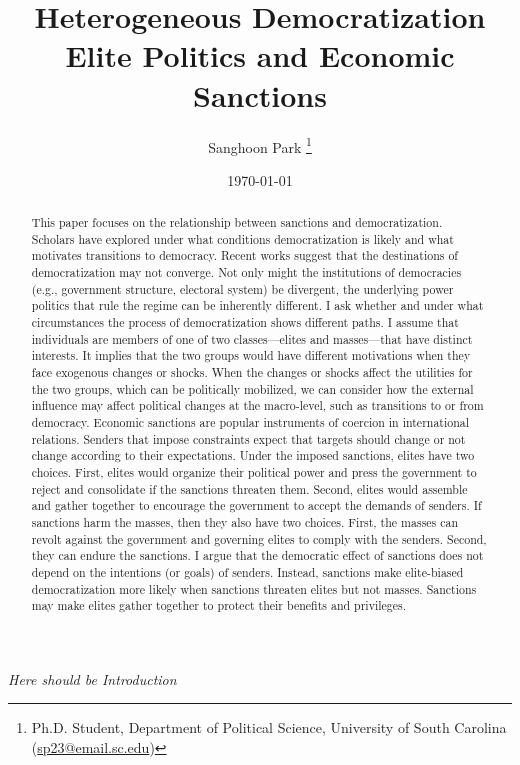 \documentclass[11pt, letterpage, titlepage]{article}
\title{\bf Heterogeneous Democratization\\
\Large Elite Politics and Economic Sanctions}
\author{Sanghoon Park
	\thanks{\small Ph.D. Student, Department of Political Science, University of South Carolina\\
		\hspace*{1.8em}(\href{sp23@email.sc.edu}{sp23@email.sc.edu})}}
\date{\today}
\begin{document}
	\maketitle

\begin{abstract}
	\onehalfspacing
	\noindent This paper focuses on the relationship between sanctions and democratization. Scholars have explored under what conditions democratization is likely and what motivates transitions to democracy. Recent works suggest that the destinations of democratization may not converge. Not only might the institutions of democracies (e.g., government structure, electoral system) be divergent, the underlying power politics that rule the regime can be inherently different. I ask whether and under what circumstances the process of democratization shows different paths. I assume that individuals are members of one of two classes---elites and masses---that have distinct interests. It implies that the two groups would have different motivations when they face exogenous changes or shocks. When the changes or shocks affect the utilities for the two groups, which can be politically mobilized, we can consider how the external influence may affect political changes at the macro-level, such as transitions to or from democracy. Economic sanctions are popular instruments of coercion in international relations. Senders that impose constraints expect that targets should change or not change according to their expectations. Under the imposed sanctions, elites have two choices. First, elites would organize their political power and press the government to reject and consolidate if the sanctions threaten them. Second, elites would assemble and gather together to encourage the government to accept the demands of senders. If sanctions harm the masses, then they also have two choices. First, the masses can revolt against the government and governing elites to comply with the senders. Second, they can endure the sanctions. I argue that the democratic effect of sanctions does not depend on the intentions (or goals) of senders. Instead, sanctions make elite-biased democratization more likely when sanctions threaten elites but not masses. Sanctions may make elites gather together to protect their benefits and privileges.
\end{abstract}
\newpage
\section*{}
\textit{Here should be Introduction}
\end{document}
